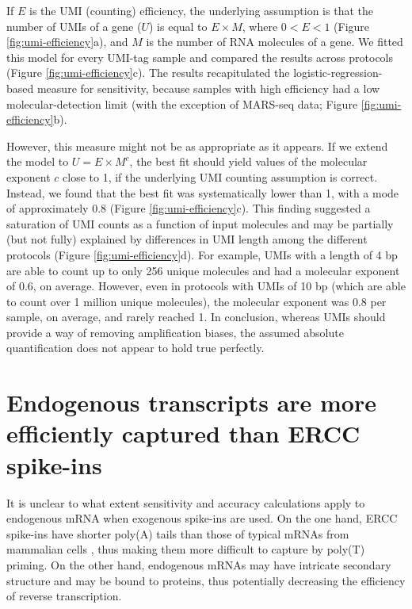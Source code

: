 If \( E \) is the UMI (counting) efficiency, the underlying assumption is that the number of UMIs of a gene (\( U \)) is equal to \( E \times M \), where \( 0 < E < 1 \) (Figure \ref{fig:umi-efficiency}a), and \( M \) is the number of RNA molecules of a gene. We fitted this model for every UMI-tag sample and compared the results across protocols (Figure \ref{fig:umi-efficiency}c). The results recapitulated the logistic-regression-based measure for sensitivity, because samples with high efficiency had a low molecular-detection limit (with the exception of MARS-seq data; Figure \ref{fig:umi-efficiency}b).

However, this measure might not be as appropriate as it appears. If we extend the model to \( U = E \times M^c \), the best fit should yield values of the molecular exponent \( c \) close to 1, if the underlying UMI counting assumption is correct. Instead, we found that the best fit was systematically lower than 1, with a mode of approximately 0.8 (Figure \ref{fig:umi-efficiency}c). This finding suggested a saturation of UMI counts as a function of input molecules and may be partially (but not fully) explained by differences in UMI length among the different protocols (Figure \ref{fig:umi-efficiency}d). For example, UMIs with a length of 4 bp are able to count up to only 256 unique molecules and had a molecular exponent of 0.6, on average. However, even in protocols with UMIs of 10 bp (which are able to count over 1 million unique molecules), the molecular exponent was 0.8 per sample, on average, and rarely reached 1. In conclusion, whereas UMIs should provide a way of removing amplification biases, the assumed absolute quantification does not appear to hold true perfectly.

\section{Endogenous transcripts are more efficiently captured than ERCC spike-ins}

It is unclear to what extent sensitivity and accuracy calculations apply to endogenous mRNA when exogenous spike-ins are used. On the one hand, ERCC spike-ins have shorter poly(A) tails than those of typical mRNAs from mammalian cells \cite{Viphakone2008-kh}, thus making them more difficult to capture by poly(T) priming. On the other hand, endogenous mRNAs may have intricate secondary structure and may be bound to proteins, thus potentially decreasing the efficiency of reverse transcription.

